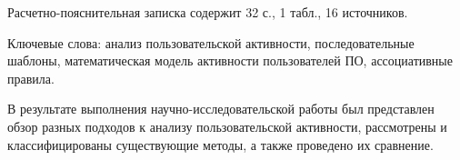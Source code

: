 
Расчетно-пояснительная записка содержит 32 с., 1 табл., 16 источников.

Ключевые слова: анализ пользовательской активности, последовательные шаблоны, математическая модель активности пользователей ПО, ассоциативные правила.


%

В результате выполнения научно-исследовательской работы был представлен обзор разных подходов к анализу пользовательской активности, рассмотрены и классифицированы существующие методы, а также проведено их сравнение.
